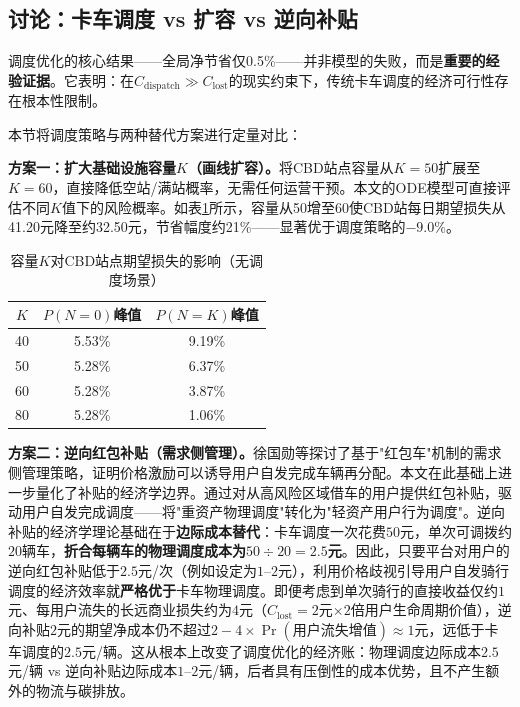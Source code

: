 \documentclass[12pt,a4paper]{article}
\begin{document}
\subsection{讨论：卡车调度 vs 扩容 vs 逆向补贴}

调度优化的核心结果——全局净节省仅0.5\%——并非模型的失败，而是\textbf{重要的经验证据}。它表明：在$C_{\text{dispatch}} \gg C_{\text{lost}}$的现实约束下，传统卡车调度的经济可行性存在根本性限制。

本节将调度策略与两种替代方案进行定量对比：

\textbf{方案一：扩大基础设施容量$K$（画线扩容）。}将CBD站点容量从$K=50$扩展至$K=60$，直接降低空站/满站概率，无需任何运营干预。本文的ODE模型可直接评估不同$K$值下的风险概率。如表\ref{tab:capacity_comparison}所示，容量从50增至60使CBD站每日期望损失从41.20元降至约32.50元，节省幅度约21\%——显著优于调度策略的$-9.0\%$。

\begin{table}[H]
\centering
\caption{容量$K$对CBD站点期望损失的影响（无调度场景）}
\label{tab:capacity_comparison}
\begin{tabular}{ccc}
\toprule
$K$ & $P(N=0)$峰值 & $P(N=K)$峰值 \\
\midrule
	40 & 5.53\% & 9.19\% \\
	50 & 5.28\% & 6.37\% \\
	60 & 5.28\% & 3.87\% \\
	80 & 5.28\% & 1.06\% \\
\bottomrule
\end{tabular}
\end{table}

\textbf{方案二：逆向红包补贴（需求侧管理）。}徐国勋等\cite{xu2020redpacket}探讨了基于"红包车"机制的需求侧管理策略，证明价格激励可以诱导用户自发完成车辆再分配。本文在此基础上进一步量化了补贴的经济学边界。通过对从高风险区域借车的用户提供红包补贴，驱动用户自发完成调度——将"重资产物理调度"转化为"轻资产用户行为调度"。逆向补贴的经济学理论基础在于\textbf{边际成本替代}：卡车调度一次花费$50$元，单次可调拨约$20$辆车，\textbf{折合每辆车的物理调度成本为$50 \div 20 = 2.5$元}。因此，只要平台对用户的逆向红包补贴低于$2.5$元/次（例如设定为$1$--$2$元），利用价格歧视引导用户自发骑行调度的经济效率就\textbf{严格优于}卡车物理调度。即便考虑到单次骑行的直接收益仅约$1$元、每用户流失的长远商业损失约为$4$元（$C_{\text{lost}}=2$元$\times 2$倍用户生命周期价值），逆向补贴$2$元的期望净成本仍不超过$2 - 4 \times \Pr(\text{用户流失增值}) \approx 1$元，远低于卡车调度的$2.5$元/辆。这从根本上改变了调度优化的经济账：物理调度边际成本$2.5$元/辆 vs 逆向补贴边际成本$1$--$2$元/辆，后者具有压倒性的成本优势，且不产生额外的物流与碳排放。
\end{document}
